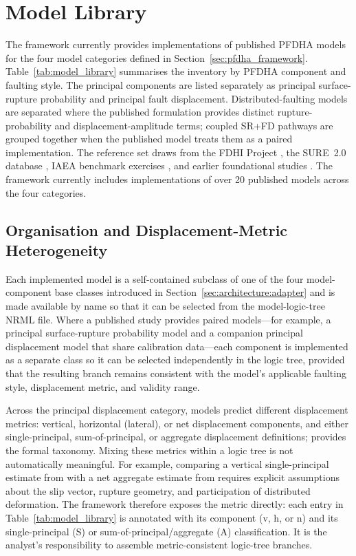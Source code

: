 \section{Model Library}
\label{sec:model_library}

The framework currently provides implementations of published PFDHA models for the four model categories defined in Section~\ref{sec:pfdha_framework}. Table~\ref{tab:model_library} summarises the inventory by PFDHA component and faulting style. The principal components are listed separately as principal surface-rupture probability and principal fault displacement. Distributed-faulting models are separated where the published formulation provides distinct rupture-probability and displacement-amplitude terms; coupled SR+FD pathways are grouped together when the published model treats them as a paired implementation. The reference set draws from the FDHI Project \citep{Bozorgnia2021, Sarmiento2025}, the SURE~2.0 database \citep{Nurminen2022, Visini2025}, IAEA benchmark exercises \citep{valentini_probabilistic_2021, Valentini2025}, and earlier foundational studies \citep{youngs_methodology_2003, Petersen2011, MossRoss2011, Takao2013}. The framework currently includes implementations of over 20 published models across the four categories.


\subsection{Organisation and Displacement-Metric Heterogeneity}
\label{sec:model_library:organisation}

Each implemented model is a self-contained subclass of one of the four model-component base classes introduced in Section~\ref{sec:architecture:adapter} and is made available by name so that it can be selected from the model-logic-tree NRML file. Where a published study provides paired models---for example, a principal surface-rupture probability model and a companion principal displacement model that share calibration data---each component is implemented as a separate class so it can be selected independently in the logic tree, provided that the resulting branch remains consistent with the model's applicable faulting style, displacement metric, and validity range.

Across the principal displacement category, models predict different displacement metrics: vertical, horizontal (lateral), or net displacement components, and either single-principal, sum-of-principal, or aggregate displacement definitions; \citet[Table~1]{Sarmiento2025} provides the formal taxonomy. Mixing these metrics within a logic tree is not automatically meaningful. For example, comparing a vertical single-principal estimate from \citet{youngs_methodology_2003} with a net aggregate estimate from \citet{Kuehn2024} requires explicit assumptions about the slip vector, rupture geometry, and participation of distributed deformation. The framework therefore exposes the metric directly: each entry in Table~\ref{tab:model_library} is annotated with its component (v, h, or n) and its single-principal (S) or sum-of-principal/aggregate (A) classification. It is the analyst's responsibility to assemble metric-consistent logic-tree branches.

